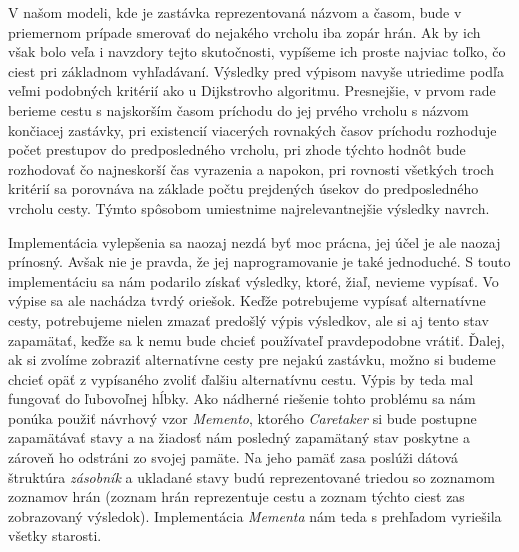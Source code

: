 V našom modeli, kde je zastávka reprezentovaná názvom a časom, bude v priemernom prípade smerovať do nejakého vrcholu iba zopár hrán. Ak by ich však bolo veľa i navzdory tejto skutočnosti, vypíšeme ich proste najviac toľko, čo ciest pri základnom vyhľadávaní. Výsledky pred výpisom navyše utriedime podľa veľmi podobných kritérií ako u Dijkstrovho algoritmu. Presnejšie, v prvom rade berieme cestu s najskorším časom príchodu do jej prvého vrcholu s názvom končiacej zastávky, pri existencií viacerých rovnakých časov príchodu rozhoduje počet prestupov do predposledného vrcholu, pri zhode týchto hodnôt bude rozhodovať čo najneskorší čas vyrazenia a napokon, pri rovnosti všetkých troch kritérií sa porovnáva na základe počtu prejdených úsekov do predposledného vrcholu cesty. Týmto spôsobom umiestnime najrelevantnejšie výsledky navrch.\newline

Implementácia vylepšenia sa naozaj nezdá byť moc prácna, jej účel je ale naozaj prínosný. Avšak nie je pravda, že jej naprogramovanie je také jednoduché. S touto implementáciu sa nám podarilo získať výsledky, ktoré, žiaľ, nevieme vypísať. Vo výpise sa ale nachádza tvrdý oriešok. Keďže potrebujeme vypísať alternatívne cesty, potrebujeme nielen zmazať predošlý výpis výsledkov, ale si aj tento stav zapamätať, keďže sa k nemu bude chcieť používateľ pravdepodobne vrátiť. Ďalej, ak si zvolíme zobraziť alternatívne cesty pre nejakú zastávku, možno si budeme chcieť opäť z vypísaného zvoliť ďalšiu alternatívnu cestu. Výpis by teda mal fungovať do ľubovoľnej hĺbky. Ako nádherné riešenie tohto problému sa nám ponúka použiť návrhový vzor \textit{Memento}, ktorého \textit{Caretaker} si bude postupne zapamätávať stavy a na žiadosť nám posledný zapamätaný stav poskytne a zároveň ho odstráni zo svojej pamäte. Na jeho pamäť zasa poslúži dátová štruktúra \textit{zásobník} a ukladané stavy budú reprezentované triedou so zoznamom zoznamov hrán (zoznam hrán reprezentuje cestu a zoznam týchto ciest zas zobrazovaný výsledok). Implementácia \textit{Mementa} nám teda s prehľadom vyriešila všetky starosti.\newline


